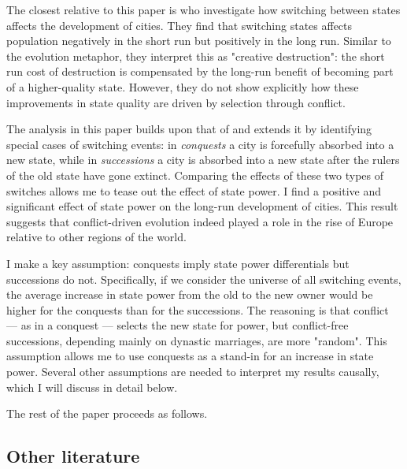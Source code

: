 \documentclass{article}
\begin{document}
The closest relative to this paper is \cite{schoenholzer2022} who investigate how switching between states affects the development of cities. They find that switching states affects population negatively in the short run but positively in the long run. Similar to the evolution metaphor, they interpret this as "creative destruction": the short run cost of destruction is compensated by the long-run benefit of becoming part of a higher-quality state. However, they do not show explicitly how these improvements in state quality are driven by selection through conflict.

The analysis in this paper builds upon that of \cite{schoenholzer2022} and extends it by identifying special cases of switching events: in \textit{conquests} a city is forcefully absorbed into a new state, while in \textit{successions} a city is absorbed into a new state after the rulers of the old state have gone extinct. Comparing the effects of these two types of switches allows me to tease out the effect of state power. I find a positive and significant effect of state power on the long-run development of cities. This result suggests that conflict-driven evolution indeed played a role in the rise of Europe relative to other regions of the world.

I make a key assumption: conquests imply state power differentials but successions do not. Specifically, if we consider the universe of all switching events, the average increase in state power from the old to the new owner would be higher for the conquests than for the successions. The reasoning is that conflict --- as in a conquest --- selects the new state for power, but conflict-free successions, depending mainly on dynastic marriages, are more "random". This assumption allows me to use conquests as a stand-in for an increase in state power. Several other assumptions are needed to interpret my results causally, which I will discuss in detail below.

The rest of the paper proceeds as follows.








\subsection*{Other literature}
\end{document}
